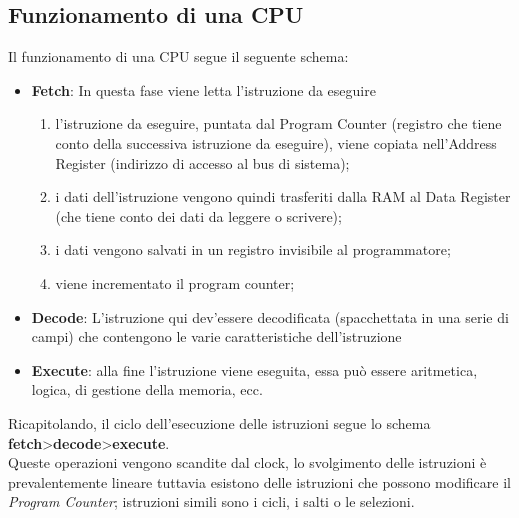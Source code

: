 \documentclass[class=book, crop=false]{standalone}
\begin{document}
\subsection{Funzionamento di una CPU}
Il funzionamento di una CPU segue il seguente schema:
\begin{itemize}[noitemsep]
	\item \textbf{Fetch}: In questa fase viene letta l'istruzione da eseguire
	\begin{enumerate}
		\item l'istruzione da eseguire, puntata dal Program Counter (registro che tiene conto della successiva istruzione da eseguire), viene copiata nell'Address Register (indirizzo di accesso al bus di sistema);
		\item i dati dell'istruzione vengono quindi trasferiti dalla RAM al Data Register (che tiene conto dei dati da leggere o scrivere);
		\item i dati vengono salvati in un registro invisibile al programmatore;
		\item viene incrementato il program counter;
	\end{enumerate}
	\item \textbf{Decode}: L’istruzione qui dev’essere decodificata (spacchettata in una serie di campi) che contengono le varie caratteristiche dell’istruzione
	\item \textbf{Execute}:  alla fine l’istruzione viene eseguita, essa può essere aritmetica, logica, di gestione della memoria, ecc.
\end{itemize}
Ricapitolando, il ciclo dell’esecuzione delle istruzioni segue lo schema \textbf{fetch}>\textbf{decode}>\textbf{execute}.\\
Queste operazioni vengono scandite dal clock, lo svolgimento delle istruzioni è prevalentemente lineare tuttavia esistono delle istruzioni che possono modificare il \emph{Program Counter}; istruzioni simili sono i cicli, i salti o le selezioni.
\end{document}

